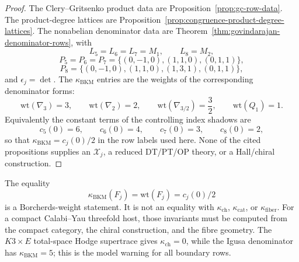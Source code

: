 \begin{proof}
The Clery--Gritsenko product data are
Proposition~\ref{prop:gc-row-data}.  The product-degree lattices are
Proposition~\ref{prop:congruence-product-degree-lattices}.  The
nonabelian denominator data are
Theorem~\ref{thm:govindarajan-denominator-rows}, with
$$
L_5=L_6=L_7=M_1,\qquad L_8=M_2,
$$
$$
P_5=P_6=P_7=\{(0,-1,0),(1,1,0),(0,1,1)\},
$$
$$
P_8=\{(0,-1,0),(1,1,0),(1,3,1),(0,1,1)\},
$$
and $\epsilon_j=\det$.  The $\kappa_{\mathrm{BKM}}$ entries are the
weights of the corresponding denominator forms:
$$
\mathrm{wt}(\nabla_3)=3,\qquad
\mathrm{wt}(\nabla_2)=2,\qquad
\mathrm{wt}(\nabla_{3/2})=\frac32,\qquad
\mathrm{wt}(Q_1)=1.
$$
Equivalently the constant terms of the controlling index shadows are
$$
c_5(0)=6,\qquad c_6(0)=4,\qquad c_7(0)=3,\qquad c_8(0)=2,
$$
so that $\kappa_{\mathrm{BKM}}=c_j(0)/2$ in the row labels used here.
None of the cited propositions supplies an $\mathcal X_j$, a reduced
DT/PT/OP theory, or a Hall/chiral construction.
\end{proof}

\begin{remark}
The equality
$$
\kappa_{\mathrm{BKM}}(F_j)=\mathrm{wt}(F_j)=c_j(0)/2
$$
is a Borcherds-weight statement.  It is not an equality with
$\kappa_{\mathrm{ch}}$, $\kappa_{\mathrm{cat}}$, or
$\kappa_{\mathrm{fiber}}$.  For a compact Calabi--Yau threefold host,
those invariants must be computed from the compact category, the chiral
construction, and the fibre geometry.  The $K3\times E$ total-space
Hodge supertrace gives $\kappa_{\mathrm{ch}}=0$, while the Igusa
denominator has $\kappa_{\mathrm{BKM}}=5$; this is the model warning for
all boundary rows.
\end{remark}

